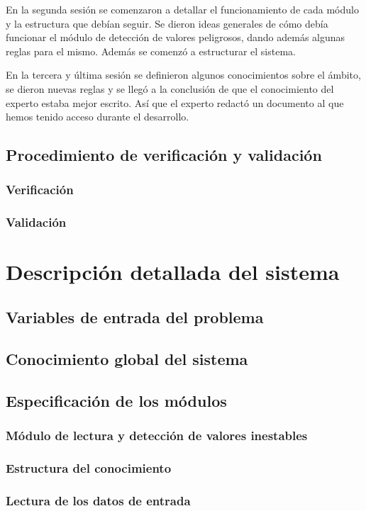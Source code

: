 \documentclass[a4paper, 11pt, titlepage]{article}
\theoremstyle{definition}
\begin{document}
  En la segunda sesión se comenzaron a detallar el funcionamiento de cada módulo
  y la estructura que debían seguir. Se dieron ideas generales de cómo debía
  funcionar el módulo de detección de valores peligrosos, dando además algunas
  reglas para el mismo. Además se comenzó a estructurar el sistema.

  En la tercera y última sesión se definieron algunos conocimientos sobre el
  ámbito, se dieron nuevas reglas y se llegó a la conclusión de que el conocimiento
  del experto estaba mejor escrito. Así que el experto redactó un documento
  al que hemos tenido acceso durante el desarrollo.

  \subsection{Procedimiento de verificación y validación}
  \subsubsection*{Verificación}
  \subsubsection*{Validación}
  \section{Descripción detallada del sistema}
  \subsection{Variables de entrada del problema}
  \subsection{Conocimiento global del sistema}
  \subsection{Especificación de los módulos}
  \subsubsection{Módulo de lectura y detección de valores inestables}
  \subsubsection*{Estructura del conocimiento}
  \subsubsection*{Lectura de los datos de entrada}
\end{document}
